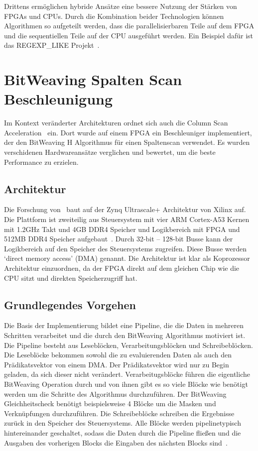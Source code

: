 \documentclass[conference]{IEEEtran}
\begin{document}
Drittens ermöglichen hybride Ansätze eine bessere Nutzung der Stärken von FPGAs und CPUs. Durch die Kombination beider Technologien
können Algorithmen so aufgeteilt werden, dass die parallelisierbaren Teile auf dem FPGA und die sequentiellen Teile auf der CPU ausgeführt werden. Ein Beispiel dafür ist das
REGEXP\_LIKE Projekt~\cite{sidler_accelerating_2017}.


\section{BitWeaving Spalten Scan Beschleunigung} \label{sec:col_scan_acc}
Im Kontext veränderter Architekturen ordnet sich auch die Column Scan Acceleration~\cite{lisa_column_2018} ein. Dort wurde auf einem FPGA ein Beschleuniger implementiert, der
den BitWeaving H Algorithmus für einen Spaltenscan verwendet. Es wurden verschidenen Hardwareansätze verglichen und bewertet, um die beste Performance zu erzielen.

\subsection{Architektur}
Die Forschung von~\cite{lisa_column_2018} baut auf der Zynq Ultrascale+ Architektur von Xilinx auf. Die Plattform ist zweiteilig aus Steuersystem mit
vier ARM Cortex-A53 Kernen mit 1.2GHz Takt und 4GB DDR4 Speicher und Logikbereich mit FPGA und 512MB DDR4 Speicher aufgebaut~\cite{lisa_column_2018}.
Durch 32-bit -- 128-bit Busse kann der Logikbereich auf den Speicher des Steuersystems zugreifen. Diese Busse werden `direct memory access' (DMA) genannt.
Die Architektur ist klar als Koprozessor Architektur einzuordnen, da der FPGA direkt auf dem gleichen Chip wie die CPU sitzt und direkten Speicherzugriff hat.


\subsection{Grundlegendes Vorgehen}
Die Basis der Implementierung bildet eine Pipeline, die die Daten in mehreren Schritten verarbeitet und die durch den BitWeaving Algorithmus motiviert ist. Die Pipeline besteht aus Leseblöcken,
Verarbeitungsblöcken und Schreibeblöcken. Die Leseblöcke bekommen sowohl die zu evaluierenden Daten als auch den Prädikatsvektor von einem DMA\@.
Der Prädikatsvektor wird nur zu Begin geladen, da sich dieser nicht verändert.
Verarbeitugsblöcke führen die eigentliche BitWeaving Operation durch und von ihnen gibt es so viele Blöcke wie benötigt werden um die Schritte des Algorithmus durchzuführen.
Der BitWeaving Gleichheitscheck benötigt beispielsweise 4 Blöcke um die Masken und Verknüpfungen durchzuführen. Die Schreibeblöcke schreiben die Ergebnisse zurück in den
Speicher des Steuersystems. Alle Blöcke werden pipelinetypisch hintereinander geschaltet, sodass die Daten durch die Pipeline fließen und die Ausgaben des vorherigen
Blocks die Eingaben des nächsten Blocks sind~\cite{lisa_column_2018}.
\end{document}
